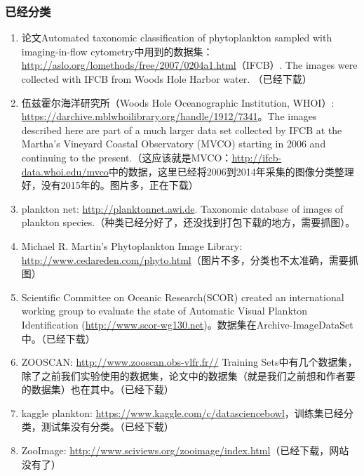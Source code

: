 \subsubsection{已经分类}
\begin{enumerate}
\item 论文Automated taxonomic classification of phytoplankton sampled with imaging-in-flow cytometry中用到的数据集：\url{http://aslo.org/lomethods/free/2007/0204a1.html}（IFCB）. The images were collected with IFCB from Woods Hole Harbor water. （已经下载）

\item 伍兹霍尔海洋研究所（Woods Hole Oceanographic Institution, WHOI）: \url{https://darchive.mblwhoilibrary.org/handle/1912/7341}。The images described here are part of a much larger data set collected by IFCB at the Martha's Vineyard Coastal Observatory (MVCO) starting in 2006 and continuing to the present.（这应该就是MVCO：\url{http://ifcb-data.whoi.edu/mvco}中的数据，这里已经将2006到2014年采集的图像分类整理好，没有2015年的。图片多，正在下载）

\item plankton net: \url{http://planktonnet.awi.de}. Taxonomic database of images of plankton species.（种类已经分好了，还没找到打包下载的地方，需要抓图）。

\item Michael R. Martin's Phytoplankton Image Library: \url{http://www.cedareden.com/phyto.html}（图片不多，分类也不太准确，需要抓图）\newline

\item Scientific Committee on Oceanic Research(SCOR) created an international working group to evaluate the state of Automatic Visual Plankton Identification (\url{http://www.scor-wg130.net})\cite{gorsky2010digital}。数据集在Archive-ImageDataSet中。（已经下载）

\item ZOOSCAN: \url{http://www.zooscan.obs-vlfr.fr//} Training Sets中有几个数据集，除了之前我们实验使用的数据集，论文中的数据集（就是我们之前想和作者要的数据集）也在其中。（已经下载）

\item kaggle plankton: \url{https://www.kaggle.com/c/datasciencebowl}，训练集已经分类，测试集没有分类。（已经下载）

\item ZooImage: \url{http://www.sciviews.org/zooimage/index.html}（已经下载，网站没有了）
\end{enumerate}

